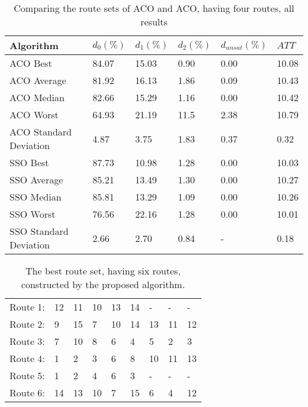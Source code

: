     \begin{table}[H]
    \centering
    \begin{tabular}{|l||l|l|l|l|l|}
    \hline
    Algorithm & $d_0(\%)$ & $d_1(\%)$ & $d_2(\%)$ & $d_{unsat}(\%)$ & $ATT$ \\
    \hline
    ACO Best & 84.07 & 15.03 & 0.90 & 0.00 & 10.08\\
    ACO Average & 81.92 & 16.13 & 1.86 & 0.09 & 10.43\\
    ACO Median & 82.66 & 15.29 & 1.16 & 0.00 & 10.42\\
    ACO Worst & 64.93 & 21.19 & 11.5 & 2.38 & 10.79\\
    ACO Standard Deviation & 4.87 & 3.75 & 1.83 & 0.37 & 0.32\\
    \hline
    \hline
    SSO Best & 87.73 & 10.98 & 1.28 & 0.00 & 10.03\\
    SSO Average & 85.21 & 13.49 & 1.30 & 0.00 & 10.27\\
    SSO Median & 85.81 & 13.29 & 1.09 & 0.00 & 10.26\\
    SSO Worst & 76.56 & 22.16 & 1.28 & 0.00 & 10.01\\
    SSO Standard Deviation & 2.66 & 2.70 & 0.84 & - & 0.18\\
    \hline
    \end{tabular}
    \caption {Comparing the route sets of ACO and ACO, having four routes, all results}
    \label{table:performanceComparison_ACOFull}
    \end{table}

\begin{table}[H]
    \centering
    \begin{tabular}{|l|l l l l l l l l|}
    \hline
    Route 1: & 12 & 11 & 10 & 13 & 14 & - & - & - \\
    Route 2: & 9 & 15 & 7 & 10 & 14 & 13 & 11 & 12 \\
    Route 3: & 7 & 10 & 8 & 6 & 4 & 5 & 2 & 3 \\
    Route 4: & 1 & 2 & 3 & 6 & 8 & 10 & 11 & 13 \\
    Route 5: & 1 & 2 & 4 & 6 & 3 & - & - & - \\
    Route 6: & 14 & 13 & 10 & 7 & 15 & 6 & 4 & 12 \\
    \hline
    \end{tabular}
    \caption {The best route set, having six routes, constructed by the proposed algorithm.}
    \label{table:performanceComparison_bestRouteSet6}
\end{table}


